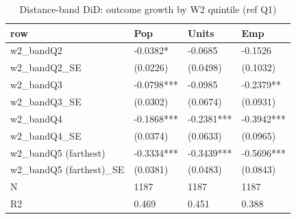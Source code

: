 \begin{table}

\caption{Distance-band DiD: outcome growth by W2 quintile (ref Q1)}
\centering
\begin{tabular}[t]{llll}
\toprule
row & Pop & Units & Emp\\
\midrule
w2\_bandQ2 & -0.0382* & -0.0685 & -0.1526\\
w2\_bandQ2\_SE & (0.0226) & (0.0498) & (0.1032)\\
w2\_bandQ3 & -0.0798*** & -0.0985 & -0.2379**\\
w2\_bandQ3\_SE & (0.0302) & (0.0674) & (0.0931)\\
w2\_bandQ4 & -0.1868*** & -0.2381*** & -0.3942***\\
\addlinespace
w2\_bandQ4\_SE & (0.0374) & (0.0633) & (0.0965)\\
w2\_bandQ5 (farthest) & -0.3334*** & -0.3439*** & -0.5696***\\
w2\_bandQ5 (farthest)\_SE & (0.0381) & (0.0483) & (0.0843)\\
N & 1187 & 1187 & 1187\\
R2 & 0.469 & 0.451 & 0.388\\
\bottomrule
\end{tabular}
\end{table}
